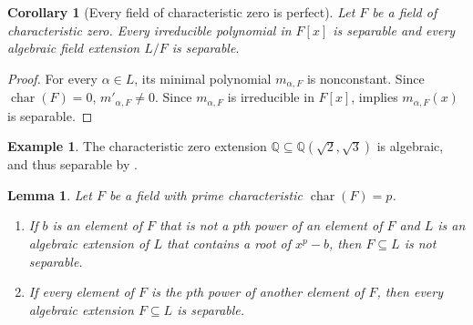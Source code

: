 \documentclass[12pt]{report}
\newtheorem{lemma}[theorem]{Lemma}
\newtheorem{corollary}[theorem]{Corollary}
\numberwithin{equation}{section}
\numberwithin{theorem}{chapter}
\theoremstyle{definition}
\newtheorem{example}[theorem]{Example}
\newtheorem*{basic properties}{Basic Properties}
\newtheorem*{Important Remark}{Important Remark}
\newcommand{\Q}{\mathbb{Q}}
\DeclareMathOperator{\ch}{char}
\begin{document}
\begin{corollary}[Every field of characteristic zero is perfect]\label{all separable in char 0}
Let $F$ be a field of characteristic zero. Every irreducible polynomial in $F[x]$ is separable and every algebraic field extension $L/F$ is separable.
\end{corollary}

\begin{proof}
For every $\alpha \in L$, its minimal polynomial $m_{\alpha, F}$ is nonconstant. Since $\ch(F)=0$, $m'_{\alpha, F} \neq 0$. Since $m_{\alpha, F}$ is irreducible in $F[x]$,  implies $m_{\alpha, F}(x)$ is separable.
\end{proof}


\begin{example}
	The characteristic zero extension $\Q \subseteq \Q(\sqrt{2}, \sqrt{3})$ is algebraic, and thus separable by .
\end{example}





\begin{lemma}\label{separable in char p}
Let $F$ be a field with prime characteristic $\ch(F) = p$. 
\begin{enumerate}[label=\alph*),leftmargin=15pt]
\item If $b$ is an element of $F$ that is not a $p$th power of an element of $F$ and $L$ is an algebraic extension of $L$ that contains a root of $x^p - b$, then $F \subseteq L$ is not separable. 
\item If every element of $F$ is the $p$th power of another element of $F$, then every algebraic extension $F \subseteq L$ is separable.
\end{enumerate}
\end{lemma}
\end{document}
